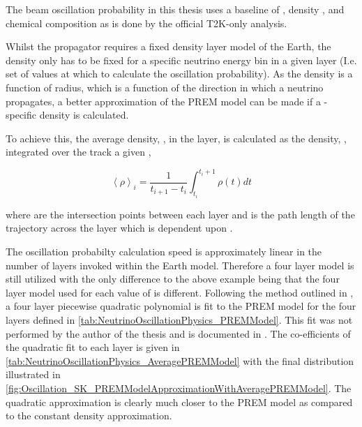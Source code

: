 The beam oscillation probability in this thesis uses a baseline of , density  \cite{Hagiwara2011}, and chemical composition  as is done by the official T2K-only analysis.

Whilst the propagator requires a fixed density layer model of the Earth, the density only has to be fixed for a specific neutrino energy  bin in a given layer (I.e. set of values at which to calculate the oscillation probability). As the density is a function of radius, which is a function of the direction in which a neutrino propagates, a better approximation of the PREM model can be made if a -specific density is calculated. 

To achieve this, the average density, , in the  layer, is calculated as the density, \quickmath{\rho}, integrated over the track a given ,

\begin{equation}
  \left< \rho \right>_{i} = \frac{1}{t_{i+1}-t_{i}} \int^{t_{i}+1}_{t_{i}} \rho(t) dt
\end{equation}

where  are the intersection points between each layer and  is the path length of the trajectory across the layer which is dependent upon .

The oscillation probabilty calculation speed is approximately linear in the number of layers invoked within the Earth model. Therefore a four layer model is still utilized with the only difference to the above example being that the four layer model used for each value of  is different. Following the method outlined in \cite{EarthGrav}, a four layer piecewise quadratic polynomial is fit to the PREM model for the four layers defined in \autoref{tab:NeutrinoOscillationPhysics_PREMModel}. This fit was not performed by the author of the thesis and is documented in \cite{t2k_tn_425}. The co-efficients of the quadratic fit to each layer is given in \autoref{tab:NeutrinoOscillationPhysics_AveragePREMModel} with the final distribution illustrated in \autoref{fig:Oscillation_SK_PREMModelApproximationWithAveragePREMModel}. The quadratic approximation is clearly much closer to the PREM model as compared to the constant density approximation.


